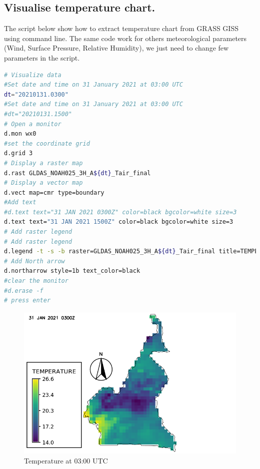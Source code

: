 \subsection{Visualise temperature chart.}
The script below show how to extract temperature chart from GRASS GISS using command line.
\newline
The same code work for others meteorological parameters (Wind, Surface Pressure, Relative Humidity), we just need to change
few parameters in the script.
\begin{lstlisting}[language=Bash]
# Visualize data
#Set date and time on 31 January 2021 at 03:00 UTC
dt="20210131.0300"
#Set date and time on 31 January 2021 at 03:00 UTC
#dt="20210131.1500"
# Open a monitor
d.mon wx0
#set the coordinate grid
d.grid 3
# Display a raster map
d.rast GLDAS_NOAH025_3H_A${dt}_Tair_final
# Display a vector map
d.vect map=cmr type=boundary
#Add text
#d.text text="31 JAN 2021 0300Z" color=black bgcolor=white size=3
d.text text="31 JAN 2021 1500Z" color=black bgcolor=white size=3
# Add raster legend
# Add raster legend
d.legend -t -s -b raster=GLDAS_NOAH025_3H_A${dt}_Tair_final title=TEMPERATURE title_fontsize=20 font=sans fontsize=18
# Add North arrow
d.northarrow style=1b text_color=black
#clear the monitor
#d.erase -f
# press enter
\end{lstlisting}
\begin{figure}[H]
\begin{center}
\includegraphics[scale=0.6]{tp03.png} %
\end{center}

\caption{Temperature at 03:00 UTC}
\label{Temperature at 03:00 UTC}%
\end{figure}
